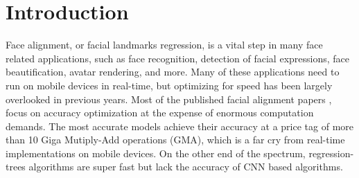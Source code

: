 \documentclass[twocolumn]{article}
\begin{document}





\section{Introduction}
Face alignment, or facial landmarks regression, is a vital step in many face related applications, such as face recognition, detection of facial expressions, face beautification, avatar rendering, and more. Many of these applications need to run on mobile devices in real-time, but optimizing for speed has been largely overlooked in previous years. Most of the published facial alignment papers \cite{zheng2020hafanet,wu2018look,chen2019face, wang2020deep}, focus on accuracy optimization at the expense of enormous computation demands. The most accurate models achieve their accuracy at a price tag of more than 10 Giga Mutiply-Add operations (GMA), which is a far cry from real-time implementations on mobile devices. On the other end of the spectrum, regression-trees algorithms \cite{kazemi2014one, lee2015face} are super fast but lack the accuracy of CNN based algorithms.
\end{document}
